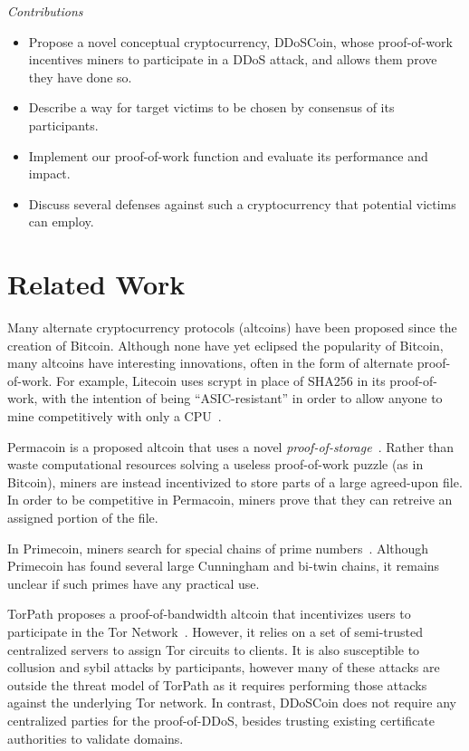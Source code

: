 \emph{Contributions}
\begin{itemize}
\item Propose a novel conceptual cryptocurrency, DDoSCoin, whose proof-of-work
incentives miners to participate in a DDoS attack, and allows them prove they have done so.
\item Describe a way for target victims to be chosen by consensus of its
participants.
\item Implement our proof-of-work function and evaluate its performance and
impact.
\item Discuss several defenses against such a cryptocurrency that potential
victims can employ.
\end{itemize}


\section{Related Work}

Many alternate cryptocurrency protocols (altcoins) have been proposed since the
creation of Bitcoin. Although none have yet eclipsed the popularity of Bitcoin,
many altcoins have interesting innovations, often in the form of alternate
proof-of-work. For example, Litecoin uses scrypt in place of SHA256 in its
proof-of-work, with the intention of being ``ASIC-resistant'' in order to allow
anyone to mine competitively with only a CPU~\cite{litecoin}.

Permacoin is a proposed altcoin that uses a novel
\emph{proof-of-storage}~\cite{permacoin}.  Rather than waste computational
resources solving a useless proof-of-work puzzle (as in Bitcoin), miners are
instead incentivized to store parts of a large agreed-upon file. In order to be
competitive in Permacoin, miners prove that they can retreive an assigned
portion of the file.

In Primecoin, miners search for special chains of prime
numbers~\cite{primecoin}. Although Primecoin has found several large Cunningham
and bi-twin chains, it remains unclear if such primes have any practical use.

TorPath proposes a proof-of-bandwidth altcoin that incentivizes users to
participate in the Tor Network~\cite{torpath}. However, it relies on a set of
semi-trusted centralized servers to assign Tor circuits to clients. It is also
susceptible to collusion and sybil attacks by participants, however many of
these attacks are outside the threat model of TorPath as it requires performing
those attacks against the underlying Tor network. In contrast, DDoSCoin does not
require any centralized parties for the proof-of-DDoS, besides trusting existing
certificate authorities to validate domains.

